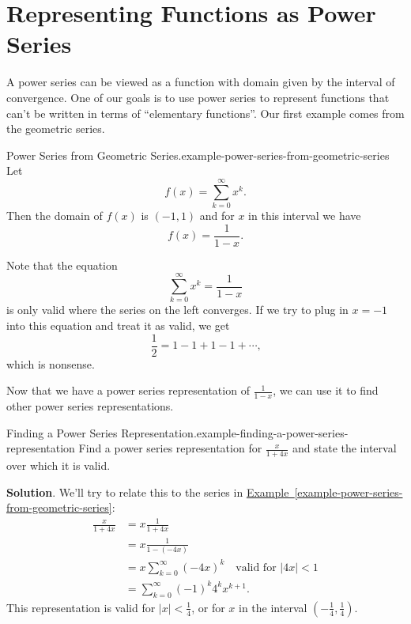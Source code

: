 \documentclass[10pt,]{book}
\numberwithin{equation}{section}
\newcommand{\lt}{<}
\newcommand{\amp}{&}
\begin{document}
\section[{Representing Functions as Power Series}]{Representing Functions as Power Series}\label{section-representing-functions-as-power-series}
\hypertarget{p-948}{}%
A power series can be viewed as a function with domain given by the interval of convergence. One of our goals is to use power series to represent functions that can't be written in terms of ``elementary functions''. Our first example comes from the geometric series.%
\begin{example}{Power Series from Geometric Series.}{example-power-series-from-geometric-series}%
\hypertarget{p-949}{}%
Let%
\begin{equation*}
f(x) = \sum_{k = 0}^{\infty} x^{k}\text{.}
\end{equation*}
Then the domain of \(f(x)\) is \((-1,1)\) and for \(x\) in this interval we have%
\begin{equation*}
f(x) = \frac{1}{1 - x}\text{.}
\end{equation*}
%
\end{example}
\hypertarget{p-950}{}%
Note that the equation%
\begin{equation*}
\sum_{k=0}^{\infty}x^{k} = \frac{1}{1 - x}
\end{equation*}
is only valid where the series on the left converges. If we try to plug in \(x = -1\) into this equation and treat it as valid, we get%
\begin{equation*}
\frac{1}{2} = 1 - 1 + 1 - 1 + \cdots\text{,}
\end{equation*}
which is nonsense.%
\par
\hypertarget{p-951}{}%
Now that we have a power series representation of \(\frac{1}{1 - x}\), we can use it to find other power series representations.%
\begin{example}{Finding a Power Series Representation.}{example-finding-a-power-series-representation}%
\hypertarget{p-952}{}%
Find a power series representation for \(\displaystyle\frac{x}{1 + 4x}\) and state the interval over which it is valid.%
\par\smallskip%
\noindent\textbf{Solution}.\hypertarget{solution-193}{}\quad%
\hypertarget{p-953}{}%
We'll try to relate this to the series in \hyperref[example-power-series-from-geometric-series]{Example~\ref{example-power-series-from-geometric-series}}:%
\begin{align*}
\frac{x}{1 + 4x} \amp = x \frac{1}{1 + 4x} \\
\amp = x \frac{1}{1 - (-4x)} \\
\amp = x \sum_{k=0}^{\infty}(-4x)^{k} \quad\text{valid for }|4x| \lt 1 \\
\amp = \sum_{k=0}^{\infty} (-1)^{k}4^{k}x^{k+1} \text{.}
\end{align*}
This representation is valid for \(|x| \lt \frac{1}{4}\), or for \(x\) in the interval \((-\frac{1}{4}, \frac{1}{4})\).%
\end{example}
\end{document}

